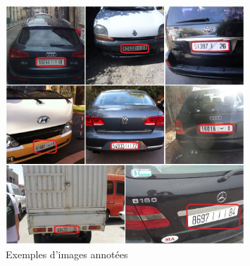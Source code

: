 \begin{frame}
\begin{columns}
\begin{column}{6cm}
\begin{figure}
\begin{overprint}
            \centering\includegraphics[width=0.8\textwidth]{figures/Data_ann.PNG}\caption{Exemples d'images annotées}
        \end{overprint}
    \end{figure}
\end{column}
\end{columns}

\end{frame}




